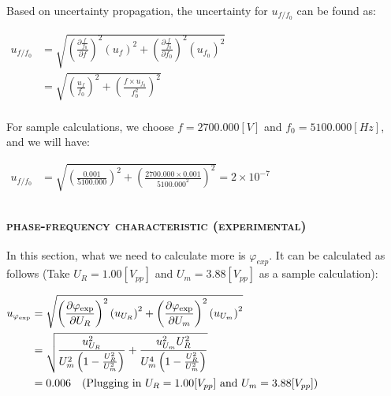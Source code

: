\documentclass[a4paper,12pt]{article}
\begin{document}
\begin{appendices}
Based on uncertainty propagation, the uncertainty for $u_{f/f_0}$ can be found as:
\begin{center}
$ \displaystyle  
\begin{aligned} 
	u_{f/f_0} &= \sqrt{(\frac{\partial \frac{f}{f_0}}{\partial f})^2(u_f)^2 + (\frac{\partial \frac{f}{f_0}}{\partial f_0})^2(u_{f_0})^2} \\
		&= \sqrt{(\frac{u_f}{f_0})^2 + (\frac{f\times u_{f_0}}{f_0^2})^2} \\ 
\end{aligned}$
\end{center}
For sample calculations, we choose $f = 2700.000 [V]$ and $f_0 = 5100.000[Hz]$, and we will have:
\begin{center}
$ \displaystyle  
\begin{aligned} 
	u_{f/f_0} &= \sqrt{(\frac{0.001}{5100.000})^2 + (\frac{2700.000 \times 0.001}{5100.000^2})^2} = 2\times 10^{-7}\\ 
\end{aligned}$
\end{center}

\subsubsection{\textsc{phase-frequency characteristic (experimental)}}
In this section, what we need to calculate more is $\varphi_{exp}$. It can be calculated as follows (Take $U_R = 1.00[V_{pp}]$ and $U_m = 3.88[V_{pp}]$ as a sample calculation):
\begin{center}
$\begin{aligned}
u_{\varphi_{\exp }} &=\sqrt{\left(\frac{\partial \varphi_{\exp }}{\partial U_{R}}\right)^2 \left(u_{U_{R}}\right)^{2}+\left(\frac{\partial \varphi_{\exp }}{\partial U_{m}}\right)^2 \left( u_{U_{m}}\right)^{2}} \\ 
	&=\sqrt{\frac{u_{U_{R}}^{2}}{U_{m}^{2} \left(1- \frac{U_R^2}{U_m^2} \right)}+\frac{u_{U_{m}}^{2} U_{R}^{2}}{U_{m}^{4}\left( 1-\frac{U_R^2}{U_m^2} \right)}} \\ 
	&=0.006\text{\quad(Plugging in } U_R = 1.00[V_{pp}] \text{ and } U_m = 3.88[V_{pp}]\text{)} \end{aligned}$
\end{center}


\end{appendices}
\end{document}
